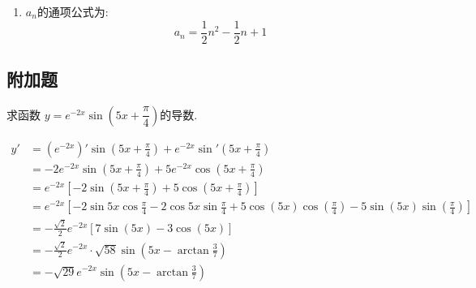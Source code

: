 \begin{questions}
\begin{solution}
\begin{enumerate}[label=\protect\circled{\arabic*}]
			\item $a_n$的通项公式为:
			      \begin{equation*}
				      a_n = \frac12n^2 - \frac12n + 1
			      \end{equation*}

		\end{enumerate}

	\end{solution}
	\begin{center}
		\section*{附加题}
	\end{center}
	\question 求函数 $y = e^{-2x}\sin\left(5x+\dfrac{\pi}{4}\right)$的导数.
	\begin{solution}
		\begin{align*}
			y' & =  (e^{-2x})'\sin\left(5x + \frac{\pi}{4}\right) + e^{-2x}\sin'\left(5x +
			\frac{\pi}{4}\right)                                                           \\
			   & = -2e^{-2x}\sin\left(5x+\frac{\pi}{4}\right) +
			5e^{-2x}\cos\left(5x+\frac{\pi}{4}\right)                                      \\
			   & = e^{-2x}\left[-2\sin\left(5x + \frac{\pi}{4}\right) + 5\cos\left(5x +
			\frac{\pi}{4}\right)\right]                                                    \\
			   & = e^{-2x}\left[-2\sin5x\cos\frac{\pi}{4} - 2\cos5x\sin\frac{\pi}{4} +
			5\cos(5x)\cos(\frac{\pi}{4}) - 5\sin(5x)\sin(\frac{\pi}{4})\right]             \\
			   & = -\frac{\sqrt{2}}{2}e^{-2x}[7\sin(5x) - 3\cos(5x)]                       \\
			   & = -\frac{\sqrt{2}}{2}e^{-2x}\cdot \sqrt{58}\sin({5x-\arctan{\frac37}})    \\
			   & = -\sqrt{29}e^{-2x}\sin(5x-\arctan\frac37)
		\end{align*}
	\end{solution}


\end{questions}
